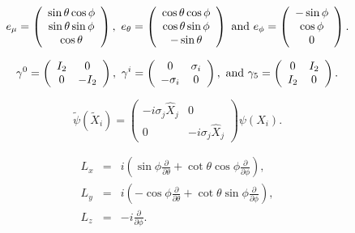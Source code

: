 \documentclass[]{article}
\begin{document}
	
	\begin{eqnarray}
		\label{unitvectors}
		e_\mu = \left(
		\begin{array}{c}
			\sin \theta \cos \phi \\
			\sin \theta \sin \phi \\
			\cos \theta
		\end{array}
		\right),\
		e_\theta = \left(
		\begin{array}{c}
			\cos \theta \cos \phi \\
			\cos \theta \sin \phi \\
			- \sin \theta
		\end{array}
		\right)\
		{\rm and}\
		e_\phi = \left(
		\begin{array}{c}
			- \sin \phi \\
			\cos \phi \\
			0
		\end{array}
		\right).
	\end{eqnarray}
	

	
	\begin{eqnarray}
		\gamma^0 =
		\left(
		\begin{array}{cc}
			I_2 & 0 \\
			0 & -I_2
		\end{array}
		\right),\
		\gamma^i =
		\left(
		\begin{array}{cc}
			0 & \sigma_i \\
			-\sigma_i & 0
		\end{array}
		\right),\
		{\rm and}\
		\gamma_5 =
		\left(
		\begin{array}{cc}
			0 & I_2 \\
			I_2 & 0
		\end{array}
		\right).
	\end{eqnarray}
	
	\begin{equation}
		\label{trafo}
		{\tilde \psi} \left({\tilde X_i}\right) =
		\left(
		\begin{array}{cc}
			-i \sigma_j {\hat X}_j & 0 \\
			0 & -i \sigma_j {\hat X}_j 
		\end{array}
		\right) 
		\psi \left(X_i \right).
	\end{equation}
	

	

	
	\begin{eqnarray}
		\nonumber
		L_x &=& i\left(\sin \phi \frac{\partial}{\partial \theta} 
		+ \cot \theta \cos \phi \frac{\partial}{\partial \phi}\right), \\
		\nonumber
		L_y &=& i\left(- \cos \phi \frac{\partial}{\partial \theta} 
		+ \cot \theta \sin \phi \frac{\partial}{\partial \phi}\right), \\
		L_z &=& -i \frac{\partial}{\partial \phi}.  
	\end{eqnarray}
	
\end{document}

